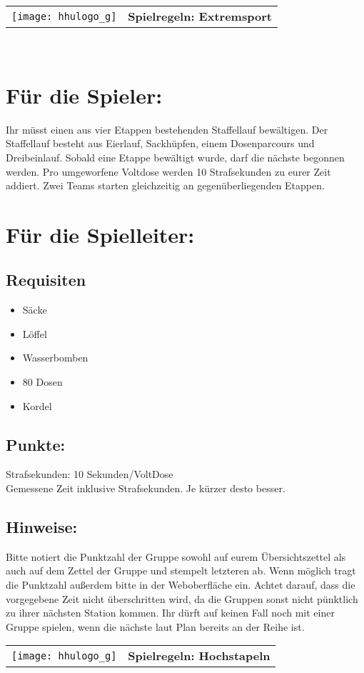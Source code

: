 \documentclass[a4paper,10pt]{article}
\def\spielb{Extremsport}
\def\spielc{Hochstapeln}
\newcommand{\unten}{
 Bitte notiert die Punktzahl der Gruppe sowohl auf eurem Übersichtszettel als auch auf dem Zettel der Gruppe und stempelt letzteren ab. Wenn möglich tragt die Punktzahl außerdem bitte in der Weboberfläche ein.
 Achtet darauf, dass die vorgegebene Zeit nicht überschritten wird, da die Gruppen sonst nicht pünktlich zu ihrer nächsten Station kommen. Ihr dürft auf keinen Fall noch mit einer Gruppe spielen, wenn die nächste laut Plan bereits an der Reihe ist.
}
\begin{document}
  \begin{tabularx}{\textwidth}{lc}
    \texttt{[image: hhulogo\_g]}
  & {\Huge \textbf{Spielregeln: \spielb}}
  \end{tabularx}\\

\Large
\section*{Für die Spieler:}
Ihr müsst einen aus vier Etappen bestehenden Staffellauf bewältigen. 
Der Staffellauf besteht aus Eierlauf, Sackhüpfen, einem Dosenparcours und 
Dreibeinlauf. Sobald eine Etappe bewältigt wurde, darf die nächste begonnen
werden. Pro umgeworfene Voltdose werden 10 Strafsekunden zu eurer Zeit 
addiert. Zwei Teams starten gleichzeitig an gegenüberliegenden Etappen.

\section*{Für die Spielleiter:}
\subsection*{Requisiten}
\begin{itemize}
\item Säcke
\item Löffel
\item Wasserbomben
\item 80 Dosen
\item Kordel
\end{itemize}
\subsection*{Punkte:}
Strafsekunden: 10 Sekunden/VoltDose\\
Gemessene Zeit inklusive Strafsekunden. Je kürzer desto besser.

\subsection*{Hinweise:}
\unten

\newpage


  \begin{tabularx}{\textwidth}{lc}
    \texttt{[image: hhulogo\_g]}
  & {\Huge \textbf{Spielregeln: \spielc}}
  \end{tabularx}\\
\end{document}
